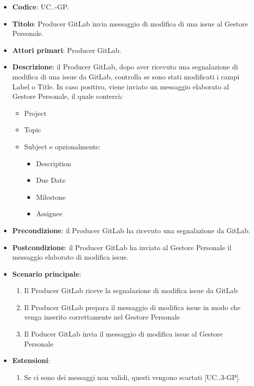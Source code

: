 			\begin{itemize}
				\item \textbf{Codice}: UC\theuccount.\thesubuccount.\thesubsubuccount-GP.
				\item \textbf{Titolo}: Producer GitLab invia messaggio di modifica di una issue al Gestore Personale.
				\item \textbf{Attori primari}: Producer GitLab.
				\item \textbf{Descrizione}: il Producer GitLab, dopo aver ricevuto una segnalazione di modifica di una issue da GitLab, controlla se sono stati modificati i campi Label o Title.
				In caso positivo, viene inviato un messaggio elaborato al Gestore Personale, il quale conterrà:
				\begin{itemize}
					\item Project
					\item Topic
					\item Subject e opzionalmente:
					\begin{itemize}
						\item Description
						\item Due Date
						\item Milestone
						\item Assignee
					\end{itemize}
				\end{itemize}
				\item \textbf{Precondizione}: il Producer GitLab ha ricevuto una segnalazione da GitLab.
				\item \textbf{Postcondizione}: il Producer GitLab ha inviato al Gestore Personale il messaggio   \newline elaborato di modifica issue.
				\item \textbf{Scenario principale}: 
				\begin{enumerate}
					\item Il Producer GitLab riceve la segnalazione di modifica issue da GitLab
					\item Il Producer GitLab prepara il messaggio di modifica issue in modo che venga inserito correttamente nel Gestore Personale
					\item Il Poducer GitLab invia il messaggio di modifica issue al Gestore Personale
				\end{enumerate}
				\item \textbf{Estensioni}: 
				\begin{enumerate}
					\item Se ci sono dei messaggi non validi, questi vengono scartati [UC\theuccount.\thesubuccount.3-GP].
				\end{enumerate}
			\end{itemize}
		
